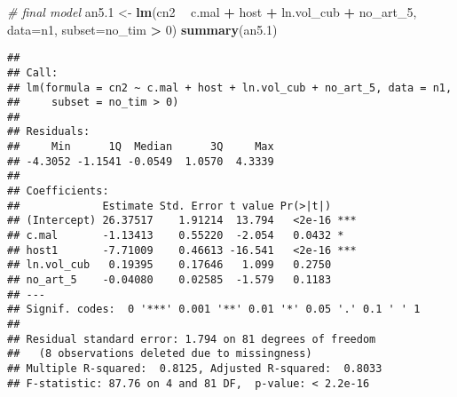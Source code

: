 \documentclass[]{article}
\newenvironment{Shaded}{\begin{snugshade}}{\end{snugshade}}
\newcommand{\KeywordTok}[1]{\textcolor[rgb]{0.13,0.29,0.53}{\textbf{#1}}}
\newcommand{\DataTypeTok}[1]{\textcolor[rgb]{0.13,0.29,0.53}{#1}}
\newcommand{\DecValTok}[1]{\textcolor[rgb]{0.00,0.00,0.81}{#1}}
\newcommand{\StringTok}[1]{\textcolor[rgb]{0.31,0.60,0.02}{#1}}
\newcommand{\CommentTok}[1]{\textcolor[rgb]{0.56,0.35,0.01}{\textit{#1}}}
\newcommand{\OperatorTok}[1]{\textcolor[rgb]{0.81,0.36,0.00}{\textbf{#1}}}
\newcommand{\NormalTok}[1]{#1}
\begin{document}
\begin{Shaded}
\begin{Highlighting}[]
\CommentTok{# final model}
\NormalTok{an5.}\DecValTok{1}\NormalTok{ <-}\StringTok{ }\KeywordTok{lm}\NormalTok{(cn2 }\OperatorTok{~}\StringTok{ }\NormalTok{c.mal }\OperatorTok{+}\StringTok{ }\NormalTok{host }\OperatorTok{+}\StringTok{ }\NormalTok{ln.vol_cub }\OperatorTok{+}\StringTok{ }\NormalTok{no_art_}\DecValTok{5}\NormalTok{, }\DataTypeTok{data=}\NormalTok{n1, }\DataTypeTok{subset=}\NormalTok{no_tim }\OperatorTok{>}\StringTok{ }\DecValTok{0}\NormalTok{)}
\KeywordTok{summary}\NormalTok{(an5.}\DecValTok{1}\NormalTok{)}
\end{Highlighting}
\end{Shaded}

\begin{verbatim}
## 
## Call:
## lm(formula = cn2 ~ c.mal + host + ln.vol_cub + no_art_5, data = n1, 
##     subset = no_tim > 0)
## 
## Residuals:
##     Min      1Q  Median      3Q     Max 
## -4.3052 -1.1541 -0.0549  1.0570  4.3339 
## 
## Coefficients:
##             Estimate Std. Error t value Pr(>|t|)    
## (Intercept) 26.37517    1.91214  13.794   <2e-16 ***
## c.mal       -1.13413    0.55220  -2.054   0.0432 *  
## host1       -7.71009    0.46613 -16.541   <2e-16 ***
## ln.vol_cub   0.19395    0.17646   1.099   0.2750    
## no_art_5    -0.04080    0.02585  -1.579   0.1183    
## ---
## Signif. codes:  0 '***' 0.001 '**' 0.01 '*' 0.05 '.' 0.1 ' ' 1
## 
## Residual standard error: 1.794 on 81 degrees of freedom
##   (8 observations deleted due to missingness)
## Multiple R-squared:  0.8125, Adjusted R-squared:  0.8033 
## F-statistic: 87.76 on 4 and 81 DF,  p-value: < 2.2e-16
\end{verbatim}

\begin{Shaded}
\end{Shaded}
\end{document}
